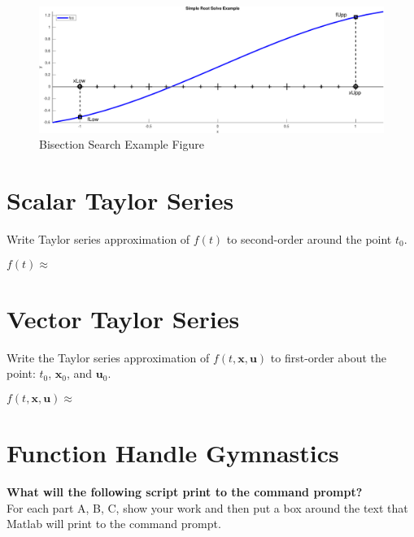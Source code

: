 \begin{figure}[ht]
	\centering
  \includegraphics[width=\textwidth]{RootSolveExampleFigure.pdf}
  \caption{Bisection Search Example Figure}
  \label{fig:RootSolveExampleFigure}
\end{figure}




\pagebreak
\section{Scalar Taylor Series}

Write Taylor series approximation of $f(t)$ to second-order around the point $t_0$.

\vspace{2em}
\begin{equation*}
  f(t) \approx \hspace{50em}
\end{equation*}
\vspace{7em}

\section{Vector Taylor Series}

Write the Taylor series approximation of $f(t, \bm{x}, \bm{u})$ to first-order
about the point: $t_0$, $\bm{x}_0$, and $\bm{u}_0$.

\vspace{2em}
\begin{equation*}
  f(t, \bm{x}, \bm{u}) \approx \hspace{46em}
\end{equation*}
\vspace{4em}


\pagebreak
\section{Function Handle Gymnastics}
\textbf{What will the following script print to the command prompt?} \\
For each part A, B, C, show your work and then put a box around
the text that Matlab will print to the command prompt.

